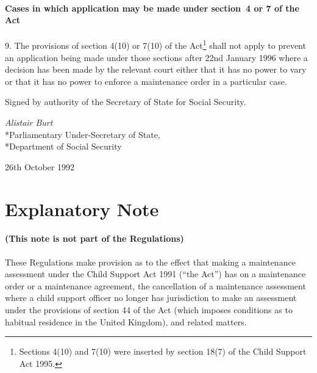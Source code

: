 \documentclass[12pt,a4paper]{article}
\begin{document}
\subsection[9. Cases in which application may be made under section 4 or 7 of the Act]{Cases in which application may be made under section~4 or 7 of the Act}

9.  The provisions of section 4(10) or 7(10) of the Act\footnote{\frenchspacing Sections 4(10) and 7(10) were inserted by section 18(7) of the Child Support Act 1995.} shall not apply to prevent an application being made under those sections after 22nd January 1996 where a decision has been made by the relevant court either that it has no power to vary or that it has no power to enforce a maintenance order in a particular case.


\bigskip

Signed by authority of the Secretary of State for Social Security.

{\raggedleft
\emph{Alistair Burt}\\*Parliamentary Under-Secretary of State,\\*Department of Social Security

}

26th October 1992

\small

\part{Explanatory Note}

\renewcommand\parthead{--- Explanatory Note}

\subsection*{(This note is not part of the Regulations)}

 These Regulations make provision as to the effect that making a maintenance assessment under the Child Support Act 1991 (“the Act”) has on a maintenance order or a maintenance agreement, the cancellation of a maintenance assessment where a child support officer no longer has jurisdiction to make an assessment under the provisions of section 44 of the Act (which imposes conditions as to habitual residence in the United Kingdom), and related matters.
\end{document}
